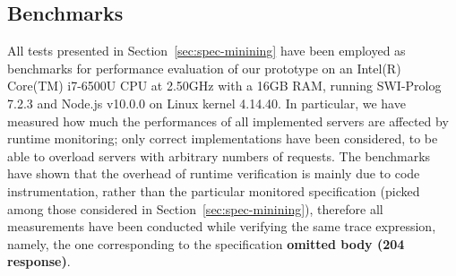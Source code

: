 \subsection{Benchmarks}

All tests presented in Section~\ref{sec:spec-minining} have been employed as benchmarks for performance evaluation
of our prototype on an Intel(R) Core(TM) i7-6500U CPU at 2.50GHz with a 16GB RAM, running SWI-Prolog 7.2.3 and Node.js v10.0.0 on
Linux kernel 4.14.40.
In particular, we have measured how much the performances of all implemented servers are affected by runtime monitoring;
only correct implementations have been considered, to be able to overload servers with arbitrary numbers of requests.
The benchmarks have shown that the overhead of runtime verification is mainly due to code instrumentation, rather than the particular monitored
specification (picked among those considered in Section~\ref{sec:spec-minining}), therefore all measurements have been conducted while verifying the same trace expression, namely, 
the one corresponding to the specification \textbf{omitted body (204 response)}.

